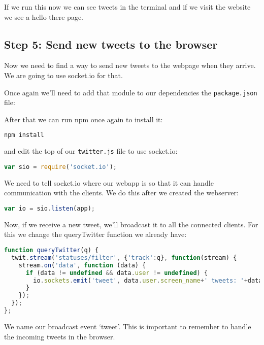 \documentclass[a4paper]{report}
\begin{document}


\noindent If we run this now we can see tweets in the terminal and if we visit the website we see a hello there page.

\subsection*{Step 5: Send new tweets to the browser}

Now we need to find a way to send new tweets to the webpage when they arrive. We are going to use socket.io for that.

Once again we'll need to add that module to our dependencies the \texttt{package.json} file:



After that we can run npm once again to install it:
\begin{lstlisting}[language=bash]
npm install
\end{lstlisting}

\noindent and edit the top of our \texttt{twitter.js} file to use socket.io:

\begin{lstlisting}[language=JavaScript]
var sio = require('socket.io');
\end{lstlisting}

\noindent We need to tell socket.io where our webapp is so that it can handle communication with the clients. We do this after we created the webserver:

\begin{lstlisting}[language=JavaScript]
var io = sio.listen(app);
\end{lstlisting}

\noindent Now, if we receive a new tweet, we'll broadcast it to all the connected clients. For this we change the queryTwitter function we already have:

\begin{lstlisting}[language=JavaScript]
function queryTwitter(q) { 
  twit.stream('statuses/filter', {'track':q}, function(stream) {
    stream.on('data', function (data) {
      if (data != undefined && data.user != undefined) {
        io.sockets.emit('tweet', data.user.screen_name+' tweets: '+data.text);
      }
    });
  });
};
\end{lstlisting}

\noindent We name our broadcast event `tweet'. This is important to remember to handle the incoming tweets in the browser.
\end{document}
